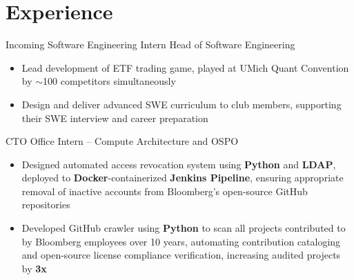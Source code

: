 \documentclass[letterpaper,11pt]{article}
\begin{document}
\section{Experience}
{Incoming Software Engineering Intern}{}
{Head of Software Engineering}{}
\begin{itemize}
    \item Lead development of ETF trading game, played at UMich Quant Convention
          by $\sim$100 competitors simultaneously
    \item Design and deliver advanced SWE curriculum to club members, supporting
          their SWE interview and career preparation
\end{itemize}
{CTO Office Intern -- Compute Architecture and OSPO}{}
\begin{itemize}
    \item Designed automated access revocation system using \textbf{Python} and
          \textbf{LDAP}, deployed to \textbf{Docker}-containerized
          \textbf{Jenkins Pipeline}, ensuring appropriate removal of inactive
          accounts from Bloomberg's open-source GitHub repositories
    \item Developed GitHub crawler using \textbf{Python} to scan all projects
          contributed to by Bloomberg employees over 10 years, automating
          contribution cataloging and open-source license compliance
          verification, increasing audited projects by \textbf{3x}
\end{itemize}
\end{document}
